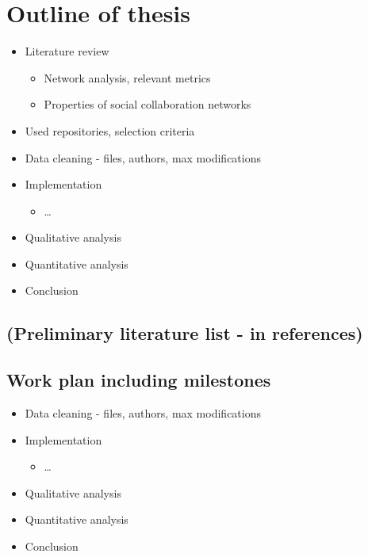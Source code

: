 

\section{Outline of thesis}
\begin{itemize}
    \item Literature review
    \begin{itemize}
        \item Network analysis, relevant metrics
        \item Properties of social collaboration networks
    \end{itemize}
    \item Used repositories, selection criteria
    \item Data cleaning - files, authors, max modifications
    \item Implementation
    \begin{itemize}
        \item \dots
    \end{itemize}
    \item Qualitative analysis
    \item Quantitative analysis
    \item Conclusion
\end{itemize}

\subsection{(Preliminary literature list - in references)}

\subsection{Work plan including milestones}

\begin{itemize}
    \item Data cleaning - files, authors, max modifications
    \item Implementation
    \begin{itemize}
        \item \dots
    \end{itemize}
    \item Qualitative analysis
    \item Quantitative analysis
    \item Conclusion
\end{itemize}
